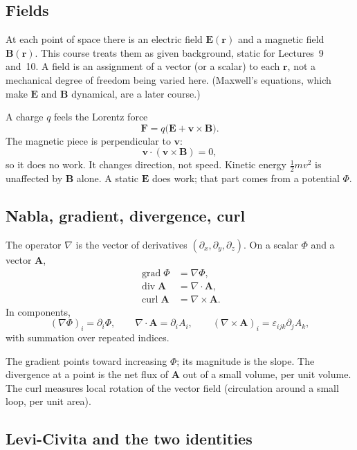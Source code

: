 \documentclass[11pt]{article}
\numberwithin{equation}{section}
\newcommand{\vect}[1]{\mathbf{#1}}
\newcommand{\epsijk}{\varepsilon_{ijk}}
\begin{document}
\subsection{Fields}

At each point of space there is an electric field $\vect{E}(\vect{r})$ and a magnetic field $\vect{B}(\vect{r})$. This course treats them as given background, static for Lectures~9 and~10. A field is an assignment of a vector (or a scalar) to each $\vect{r}$, not a mechanical degree of freedom being varied here. (Maxwell's equations, which make $\vect{E}$ and $\vect{B}$ dynamical, are a later course.)

A charge $q$ feels the Lorentz force
\begin{equation}
\label{eq:Lorentz}
\vect{F} = q\bigl(\vect{E} + \vect{v}\times\vect{B}\bigr).
\end{equation}
The magnetic piece is perpendicular to $\vect{v}$:
\[
\vect{v}\cdot(\vect{v}\times\vect{B}) = 0,
\]
so it does no work. It changes direction, not speed. Kinetic energy $\tfrac12 m v^2$ is unaffected by $\vect{B}$ alone. A static $\vect{E}$ does work; that part comes from a potential $\Phi$.

\subsection{Nabla, gradient, divergence, curl}

The operator $\nabla$ is the vector of derivatives $(\partial_x,\partial_y,\partial_z)$. On a scalar $\Phi$ and a vector $\vect{A}$,
\begin{align*}
\operatorname{grad}\Phi &= \nabla\Phi,\\
\operatorname{div}\vect{A} &= \nabla\cdot\vect{A},\\
\operatorname{curl}\vect{A} &= \nabla\times\vect{A}.
\end{align*}
In components,
\[
(\nabla\Phi)_i = \partial_i\Phi,\qquad
\nabla\cdot\vect{A} = \partial_i A_i,\qquad
(\nabla\times\vect{A})_i = \epsijk\partial_j A_k,
\]
with summation over repeated indices.

The gradient points toward increasing $\Phi$; its magnitude is the slope. The divergence at a point is the net flux of $\vect{A}$ out of a small volume, per unit volume. The curl measures local rotation of the vector field (circulation around a small loop, per unit area).

\subsection{Levi-Civita and the two identities}
\end{document}
